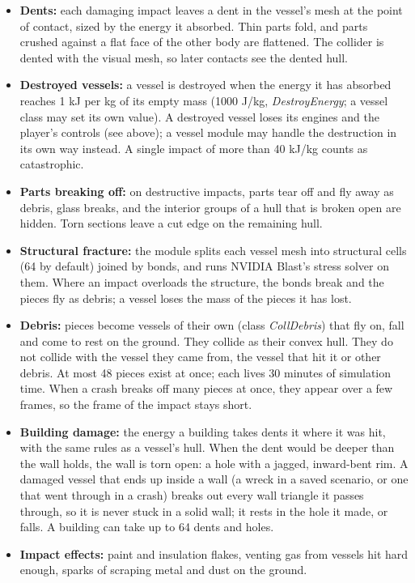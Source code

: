 \documentclass[Orbiter User Manual.tex]{subfiles}
\begin{document}
\begin{itemize}
\item \textbf{Dents:} each damaging impact leaves a dent in the vessel's mesh at the point of contact, sized by the energy it absorbed. Thin parts fold, and parts crushed against a flat face of the other body are flattened. The collider is dented with the visual mesh, so later contacts see the dented hull.
\item \textbf{Destroyed vessels:} a vessel is destroyed when the energy it has absorbed reaches 1 kJ per kg of its empty mass (1000 J/kg, \textit{DestroyEnergy}; a vessel class may set its own value). A destroyed vessel loses its engines and the player's controls (see above); a vessel module may handle the destruction in its own way instead. A single impact of more than 40 kJ/kg counts as catastrophic.
\item \textbf{Parts breaking off:} on destructive impacts, parts tear off and fly away as debris, glass breaks, and the interior groups of a hull that is broken open are hidden. Torn sections leave a cut edge on the remaining hull.
\item \textbf{Structural fracture:} the module splits each vessel mesh into structural cells (64 by default) joined by bonds, and runs NVIDIA Blast's stress solver on them. Where an impact overloads the structure, the bonds break and the pieces fly as debris; a vessel loses the mass of the pieces it has lost.
\item \textbf{Debris:} pieces become vessels of their own (class \textit{CollDebris}) that fly on, fall and come to rest on the ground. They collide as their convex hull. They do not collide with the vessel they came from, the vessel that hit it or other debris. At most 48 pieces exist at once; each lives 30 minutes of simulation time. When a crash breaks off many pieces at once, they appear over a few frames, so the frame of the impact stays short.
\item \textbf{Building damage:} the energy a building takes dents it where it was hit, with the same rules as a vessel's hull. When the dent would be deeper than the wall holds, the wall is torn open: a hole with a jagged, inward-bent rim. A damaged vessel that ends up inside a wall (a wreck in a saved scenario, or one that went through in a crash) breaks out every wall triangle it passes through, so it is never stuck in a solid wall; it rests in the hole it made, or falls. A building can take up to 64 dents and holes.
\item \textbf{Impact effects:} paint and insulation flakes, venting gas from vessels hit hard enough, sparks of scraping metal and dust on the ground.
\end{itemize}
\end{document}

